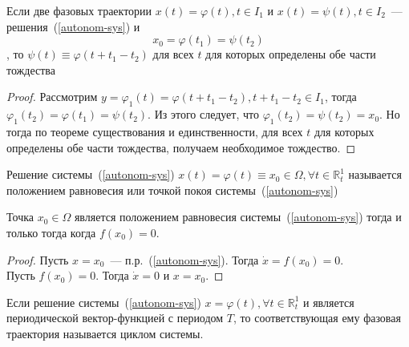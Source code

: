 \begin{theorem}
Если две фазовых траектории \(x(t) = \varphi(t), t \in I_1\) и \(x(t) = \psi(t), t \in I_2\)~--- решения~(\ref{autonom-sys}) и \[x_0 = \varphi(t_1) = \psi(t_2)\], то \(\psi(t) \equiv \varphi(t + t_1 - t_2)\) для всех $t$ для которых определены обе части тождества
\end{theorem}
\begin{proof}
Рассмотрим \(y = \varphi_1(t) = \varphi(t + t_1 - t_2), t + t_1 - t_2 \in I_1\), тогда
\( \varphi_1(t_2) = \varphi(t_1) = \psi(t_2)\). Из этого следует, что \(\varphi_1(t_2) =\psi(t_2) = x_0\). Но тогда по теореме существования и единственности, для всех $t$ для которых определены обе части тождества, получаем необходимое тождество.
\end{proof}

\begin{definition}
Решение системы~(\ref{autonom-sys}) \(x(t) = \varphi(t) \equiv x_0 \in \Omega, \forall t \in \mathbb{R}_t^1\) называется положением равновесия или точкой покоя системы~(\ref{autonom-sys})
\end{definition}

\begin{theorem}
Точка \(x_0 \in \Omega \) является положением равновесия системы~(\ref{autonom-sys}) тогда и только тогда когда \(f(x_0) = 0\).
\end{theorem}
\begin{proof}
\fbox{$\Longrightarrow$} Пусть \(x = x_0\)~--- п.р.~(\ref{autonom-sys}). Тогда \(\dot{x} = f(x_0) = 0\).\\
\fbox{$\Longleftarrow$} Пусть \(f(x_0) = 0\). Тогда \(\dot{x} = 0\) и \(x = x_0\).
\end{proof}

\begin{definition}
Если решение системы~(\ref{autonom-sys}) \(x = \varphi(t), \forall t \in \mathbb{R} _t^1\) и является периодической вектор-функцией с периодом $T$, то соответствующая ему фазовая траектория называется циклом системы.
\end{definition}

